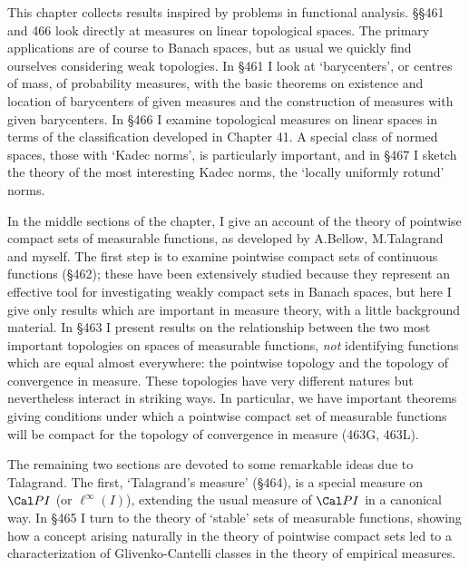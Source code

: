 
\def\chaptername{Pointwise compact sets of measurable functions}
\def\sectionname{Introduction}


This chapter collects results inspired by problems in functional
analysis.   \S\S461 and 466 look directly at measures on
linear topological spaces.   The primary applications are of course to
Banach spaces, but as usual we quickly find ourselves considering weak
topologies.   In \S461 I look at `barycenters', or centres of mass, of
probability measures, with the basic theorems on existence and location
of barycenters of given measures and the construction of measures with
given barycenters.   In \S466 I examine topological measures on linear
spaces in terms of the classification developed in Chapter 41.   A
special class of normed spaces, those with `Kadec norms', is
particularly important, and in \S467 I sketch the theory of the most
interesting Kadec norms, the `locally uniformly rotund' norms.

In the middle sections of the chapter, I give an account of the theory
of pointwise compact sets of
measurable functions, as developed by A.Bellow, M.Talagrand and myself.
The first step is to examine pointwise compact sets of continuous
functions (\S462);  these have been extensively studied because they
represent an effective tool for investigating weakly compact sets in
Banach spaces, but here I give only results which are important in measure theory,
with a little background material.   In \S463 I present results on the
relationship between the two most important topologies on spaces of
measurable functions, {\it not} identifying functions which are equal
almost everywhere:  the pointwise topology and the topology of
convergence in measure.   These topologies have very different natures
but nevertheless interact in striking ways.   In particular, we have
important theorems giving conditions under which a pointwise compact set
of measurable functions will be compact for the topology of convergence
in measure (463G, 463L).

The remaining two sections are devoted to some remarkable ideas due to
Talagrand.   The first, `Talagrand's measure' (\S464), is a special
measure on $\Cal PI$ (or $\ell^{\infty}(I)$), extending the usual
measure of $\Cal PI$ in a canonical way.   In \S465 I turn to the theory
of `stable' sets of measurable functions, showing how a concept arising
naturally in the theory of pointwise compact sets led to a
characterization of Glivenko-Cantelli classes in the theory of empirical
measures.

\discrpage

